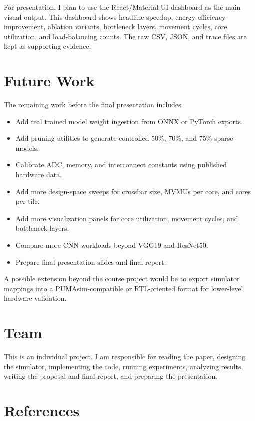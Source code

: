 \documentclass[11pt]{article}
\begin{document}
For presentation, I plan to use the React/Material UI dashboard as the main visual output. This dashboard shows headline speedup, energy-efficiency improvement, ablation variants, bottleneck layers, movement cycles, core utilization, and load-balancing counts. The raw CSV, JSON, and trace files are kept as supporting evidence.

\section{Future Work}

The remaining work before the final presentation includes:

\begin{itemize}
    \item Add real trained model weight ingestion from ONNX or PyTorch exports.
    \item Add pruning utilities to generate controlled 50\%, 70\%, and 75\% sparse models.
    \item Calibrate ADC, memory, and interconnect constants using published hardware data.
    \item Add more design-space sweeps for crossbar size, MVMUs per core, and cores per tile.
    \item Add more visualization panels for core utilization, movement cycles, and bottleneck layers.
    \item Compare more CNN workloads beyond VGG19 and ResNet50.
    \item Prepare final presentation slides and final report.
\end{itemize}

A possible extension beyond the course project would be to export simulator mappings into a PUMAsim-compatible or RTL-oriented format for lower-level hardware validation.

\section{Team}

This is an individual project. I am responsible for reading the paper, designing the simulator, implementing the code, running experiments, analyzing results, writing the proposal and final report, and preparing the presentation.

\section{References}
\end{document}
